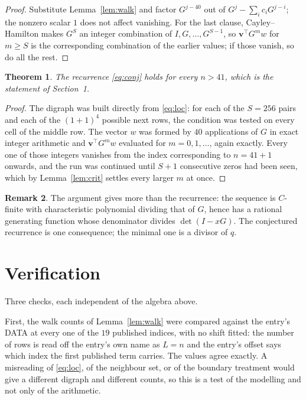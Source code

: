 \documentclass[11pt,a4paper]{article}
\theoremstyle{plain}
\newtheorem{theorem}{Theorem}
\theoremstyle{definition}
\newtheorem{remark}[theorem]{Remark}
\begin{document}
\begin{proof}
Substitute Lemma~\ref{lem:walk} and factor $G^{j-40}$ out of
$G^{j}-\sum_ic_iG^{j-i}$; the nonzero scalar $1$ does not affect
vanishing. For the last clause, Cayley--Hamilton makes $G^{S}$ an integer combination of
$I,G,\dots,G^{S-1}$, so $\mathbf{v}^{\!\top}G^{m}w$ for $m\ge S$ is the corresponding
combination of the earlier values; if those vanish, so do all the rest.
\end{proof}

\begin{theorem}
The recurrence \eqref{eq:conj} holds for every $n>41$, which is the statement of
Section~1.
\end{theorem}

\begin{proof}
The digraph was built directly from \eqref{eq:loc}: for each of the $S=256$ pairs and each
of the $(1+1)^{4}$ possible next rows, the condition was tested on every cell of
the middle row. The vector $w$ was formed by $40$ applications of $G$ in exact integer
arithmetic and $\mathbf{v}^{\!\top}G^{m}w$ evaluated for $m=0,1,\dots$, again exactly.
Every one of those integers vanishes from the index corresponding to $n=41+1$ onwards,
and the run was continued until $S+1$ consecutive zeros had been seen, which by
Lemma~\ref{lem:crit} settles every larger $m$ at once.
\end{proof}

\begin{remark}
The argument gives more than the recurrence: the sequence is $C$-finite with characteristic
polynomial dividing that of $G$, hence has a rational generating function whose denominator
divides $\det(I-xG)$. The conjectured recurrence is one consequence; the minimal one is a
divisor of $q$.
\end{remark}

\section{Verification}

Three checks, each independent of the algebra above.

First, the walk counts of Lemma~\ref{lem:walk} were compared against the entry's DATA at
every one of the $19$ published indices, with no shift fitted: the number of rows is
read off the entry's own name as $L=n$ and the entry's offset says which index the first
published term carries. The values agree exactly. A misreading of \eqref{eq:loc}, of the
neighbour set, or of the boundary treatment would give a different digraph and different
counts, so this is a test of the modelling and not only of the arithmetic.
\end{document}
